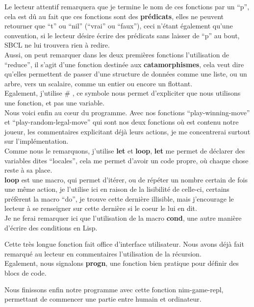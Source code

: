 \documentclass[a4paper, 12pt]{article}
\numberwithin{equation}{subsection}
\begin{document}
Le lecteur attentif remarquera que je termine le nom de ces fonctions par un ``p'', cela est dû au fait que ces fonctions sont des {\bf prédicats}, elles ne peuvent retourner que ``t'' ou ``nil'' (``vrai'' ou ``faux''), ceci n'étant également qu'une convention, si le lecteur désire écrire des prédicats sans laisser de ``p'' au bout, SBCL ne lui trouvera rien à redire.\\
Aussi, on peut remarquer dans les deux premières fonctions l'utilisation de ``reduce'', il s'agit d'une fonction destinée aux {\bf catamorphismes}, cela veut dire qu'elles permettent de passer d'une structure de données comme une liste, ou un arbre, vers un scalaire, comme un entier ou encore un flottant. \\
Egalement, j'utilise \# , ce symbole nous permet d'expliciter que nous utilisons une fonction, et pas une variable.\\

Nous voici enfin au cœur du programme. Avec nos fonctions ``play-winning-move'' et ``play-random-legal-move'' qui sont nos deux fonctions où est contenu notre joueur, les commentaires explicitant déjà leurs actions, je me concentrerai surtout sur l'implémentation. \\ Comme nous le remarquons, j'utilise {\bf let} et {\bf loop}, {\bf let} me permet de déclarer des variables dites ``locales'', cela me permet d'avoir un code propre, où chaque chose reste à sa place. \\ {\bf loop} est une macro, qui permet d'itérer, ou de répéter un nombre certain de fois une même action, je l'utilise ici en raison de la lisibilité de celle-ci, certains préfèrent la macro ``do'', je trouve cette dernière illisible, mais j'encourage le lecteur à se renseigner sur cette dernière si le coeur le lui en dit.\\

Je ne ferai remarquer ici que l'utilisation de la macro {\bf cond}, une autre manière d'écrire des conditions en Lisp.

Cette très longue fonction fait office d'interface utilisateur. Nous avons déjà fait remarqué au lecteur en commentaires l'utilisation de la récursion. \\
Egalement, nous signalons {\bf progn}, une fonction bien pratique pour définir des blocs de code.

Nous finissons enfin notre programme avec cette fonction nim-game-repl, permettant de commencer une partie entre humain et ordinateur.
\end{document}
